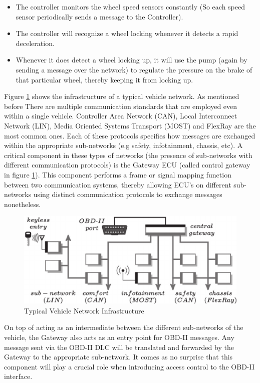 \documentclass[master=cws,masteroption=vs,english]{kulemt}
\begin{document}
\begin{itemize}
	\item The controller monitors the wheel speed sensors constantly (So each speed sensor periodically sends a message to the Controller).
	
	\item The controller will recognize a wheel locking whenever it detects a rapid deceleration.
	
	\item Whenever it does detect a wheel locking up, it will use the pump (again by sending a message over the network) to regulate the pressure on the brake of that particular wheel, thereby keeping it from locking up.
\end{itemize}

Figure \ref{fig:gateway} shows the infrastructure of a typical vehicle network. As mentioned before There are multiple communication standards that are employed even within a single vehicle. Controller Area Network (CAN), Local Interconnect Network (LIN), Media Oriented Systems Transport (MOST) and FlexRay are the most common ones. Each of these protocols specifies how messages are exchanged within the appropriate sub-networks (e.g safety, infotainment, chassis, etc). A critical component in these types of networks (the presence of sub-networks with different communication protocols) is the Gateway ECU (called control gateway in figure \ref{fig:gateway}). This component performs a frame or signal mapping function between two communication systems, thereby allowing ECU's on different sub-networks using distinct communication protocols to exchange messages nonetheless. 

\begin{figure}[h]
	\label{fig:gateway}
	\centering
	\includegraphics[width=\textwidth]{gateway.png}
	\caption{Typical Vehicle Network Infrastructure \cite{Petit}}
\end{figure}

On top of acting as an intermediate between the different sub-networks of the vehicle, the Gateway also acts as an entry point for OBD-II messages. Any message sent via the OBD-II DLC will be translated and forwarded by the Gateway to the appropriate sub-network. It comes as no surprise that this component will play a crucial role when introducing access control to the OBD-II interface.
\end{document}
